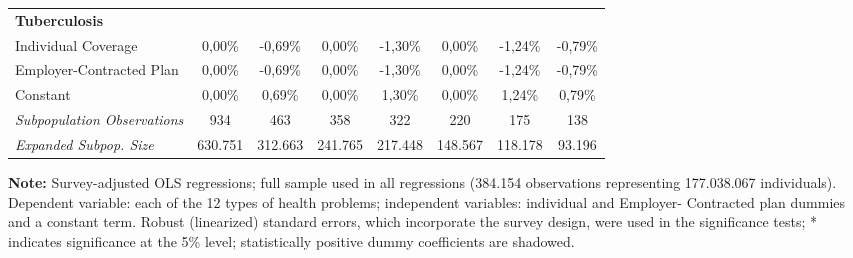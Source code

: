 \documentclass{article}
\begin{document}
\begin{table*}
{\begin{tabular}{l*{7}{c}}
\midrule
\textbf{Tuberculosis}  & & & & & & & \\

Individual Coverage      &  0,00\%         & -0,69\%         &  0,00\%         & -1,30\%\sym{*}  &  0,00\%         & -1,24\%         & -0,79\%         \\
Employer-Contracted Plan &  0,00\%         & -0,69\%         &  0,00\%         & -1,30\%\sym{*}  &  0,00\%         & -1,24\%         & -0,79\%         \\
Constant                 &  0,00\%         &  0,69\%         &  0,00\%         &  1,30\%\sym{*}  &  0,00\%         &  1,24\%         &  0,79\%         \\

\midrule

\textit{Subpopulation Observations} 	& 934 & 463 & 358 & 322 & 220 & 175 & 138         \\
\textit{Expanded Subpop. Size} 		& 630.751 & 312.663 & 241.765 & 217.448 & 148.567 & 118.178 & 93.196      \\

	\hline \hline

\end{tabular}}

\justify \small {} \textbf{Note:} Survey-adjusted OLS regressions; full sample used in all regressions (384.154 observations representing 177.038.067
individuals). Dependent variable: each of the 12 types of health problems; independent variables: individual and Employer-
Contracted plan dummies and a constant term. Robust (linearized) standard errors, which incorporate the survey design, were
used in the significance tests; * indicates significance at the 5\% level; statistically positive dummy coefficients are shadowed.

\end{table*}





















\newpage
\end{document}
